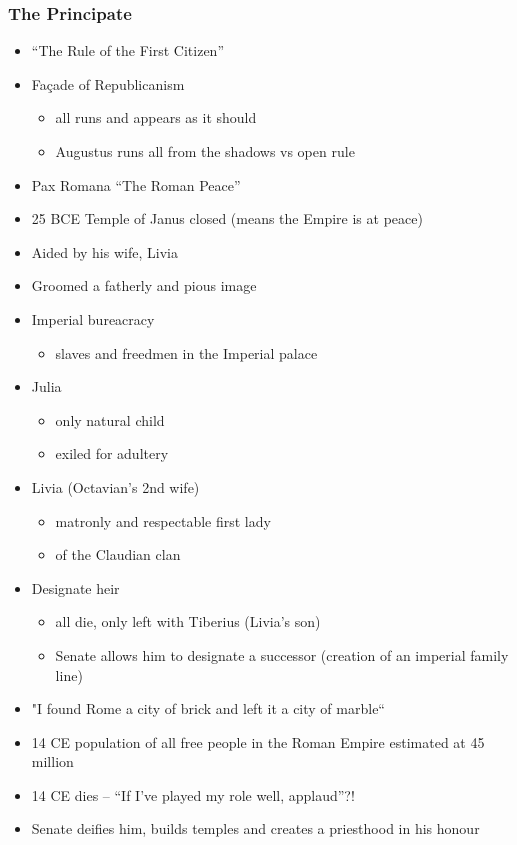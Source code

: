 \documentclass[12pt, twoside]{article}
\begin{document}
\subsubsection{The Principate}
\begin{itemize}
\item “The Rule of the First Citizen”
\item Façade of Republicanism
	\begin{itemize}
	\item all runs and appears as it should
	\item Augustus runs all from the shadows vs open rule
	\end{itemize}
\item Pax Romana “The Roman Peace”
\item 25 BCE Temple of Janus closed (means the Empire is at peace)
\item Aided by his wife, Livia
\item Groomed a fatherly and pious image
\item Imperial bureacracy
	\begin{itemize}
	\item slaves and freedmen in the Imperial palace
	\end{itemize}
\item Julia
	\begin{itemize}
	\item only natural child
	\item exiled for adultery
	\end{itemize}
\item Livia (Octavian’s 2nd wife)
	\begin{itemize}
	\item matronly and respectable first lady
	\item of the Claudian clan
	\end{itemize}
\item Designate heir
	\begin{itemize}
	\item all die, only left with Tiberius (Livia’s son)
	\item Senate allows him to designate a successor (creation of an imperial family line)
	\end{itemize}
\item "I found Rome a city of brick and left it a city of marble“
\item 14 CE population of all free people in the Roman Empire estimated at 45 million
\item 14 CE dies – “If I’ve played my role well, applaud”?!
\item Senate deifies him, builds temples and creates a priesthood in his honour
\end{itemize}
\end{document}
